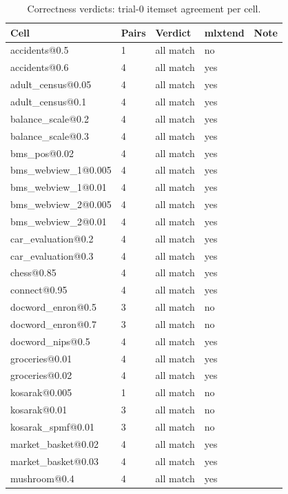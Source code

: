 \documentclass[twocolumn,10pt]{article}
\begin{document}
\begin{table}[t]
\centering
\footnotesize
\caption{Correctness verdicts: trial-0 itemset agreement per cell.}
\label{tab:correctness}
\setlength{\tabcolsep}{3pt}
\begin{tabular}{p{4.2cm}p{2.2cm}p{2.5cm}p{2.2cm}p{3.5cm}}
\toprule
Cell & Pairs & Verdict & mlxtend & Note \\
\midrule
accidents@0.5 & 1 & all match & no &  \\
accidents@0.6 & 4 & all match & yes &  \\
adult\_census@0.05 & 4 & all match & yes &  \\
adult\_census@0.1 & 4 & all match & yes &  \\
balance\_scale@0.2 & 4 & all match & yes &  \\
balance\_scale@0.3 & 4 & all match & yes &  \\
bms\_pos@0.02 & 4 & all match & yes &  \\
bms\_webview\_1@0.005 & 4 & all match & yes &  \\
bms\_webview\_1@0.01 & 4 & all match & yes &  \\
bms\_webview\_2@0.005 & 4 & all match & yes &  \\
bms\_webview\_2@0.01 & 4 & all match & yes &  \\
car\_evaluation@0.2 & 4 & all match & yes &  \\
car\_evaluation@0.3 & 4 & all match & yes &  \\
chess@0.85 & 4 & all match & yes &  \\
connect@0.95 & 4 & all match & yes &  \\
docword\_enron@0.5 & 3 & all match & no &  \\
docword\_enron@0.7 & 3 & all match & no &  \\
docword\_nips@0.5 & 4 & all match & yes &  \\
groceries@0.01 & 4 & all match & yes &  \\
groceries@0.02 & 4 & all match & yes &  \\
kosarak@0.005 & 1 & all match & no &  \\
kosarak@0.01 & 3 & all match & no &  \\
kosarak\_spmf@0.01 & 3 & all match & no &  \\
market\_basket@0.02 & 4 & all match & yes &  \\
market\_basket@0.03 & 4 & all match & yes &  \\
mushroom@0.4 & 4 & all match & yes &  \\

\end{tabular}
\end{table}
\end{document}
